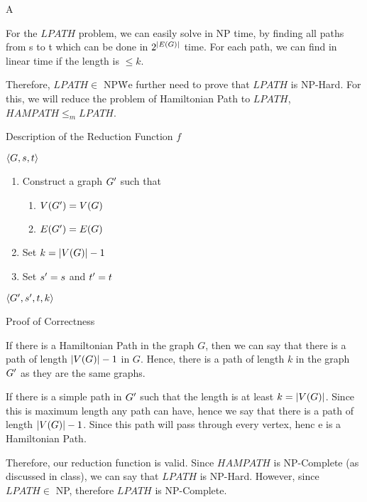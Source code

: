 \documentclass{article}
\begin{document}
\begin{question}

	\begin{qpart}{A}

		For the $LPATH$ problem, we can easily solve in NP time, by finding all paths from s to t which can be done in $2^{\left| {E(G)} \right|}$ time. For each path, we can find in linear time if the length is $\le k$. \br%

		Therefore, $LPATH \in$ NP\. We further need to prove that $LPATH$ is NP-Hard. For this, we will reduce the problem of Hamiltonian Path to $LPATH$,  $HAMPATH \le _m LPATH$. \br%

		\begin{qsubsection}{Description of the Reduction Function $f$}

			 $\left\langle G, s, t \right\rangle$
			\begin{enumerate}[label = (\alph*) ]
				\item Construct a graph $G^{\prime}$ such that
					\begin{enumerate}[label = (\roman*) ]
						\item $V(G^{\prime}) = V(G)$
						\item $E(G^{\prime}) = E(G)$
					\end{enumerate}
				\item Set $k = \left| {V(G)} \right| - 1$
				\item Set $s^{\prime} = s$ and $t^{\prime} = t$
			\end{enumerate}
			 $\left\langle G^{\prime}, s^{\prime}, t, k \right\rangle$

		\end{qsubsection}

		\begin{qsubsection}{Proof of Correctness}

			If there is a Hamiltonian Path in the graph $G$, then we can say that there is a path of length $\left| {V(G)} \right| - 1$ in $G$. Hence, there is a path of length $k$ in the graph $G^{\prime}$ as they are the same graphs. \br%

			If there is a simple path in $G^{\prime}$ such that the length is at least $k = \left| {V(G)} \right|$. Since this is maximum length any path can have, hence we say that there is a path of length $\left| {V(G)} \right| - 1$. Since this path will pass through every vertex, henc e is a Hamiltonian Path. \br%

		\end{qsubsection}

		Therefore, our reduction function is valid. Since $HAMPATH$ is NP-Complete (as discussed in class), we can say that $LPATH$ is NP-Hard. However, since $LPATH \in$ NP, therefore $LPATH$ is NP-Complete.


\end{qpart}
\end{question}
\end{document}
